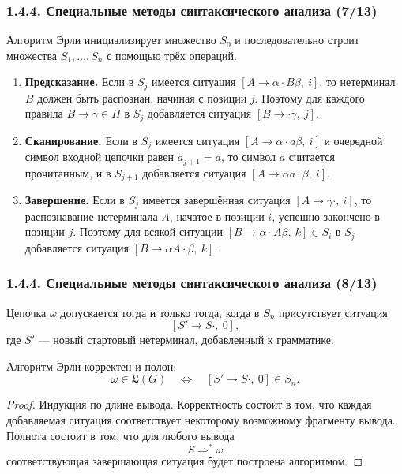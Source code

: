 \begin{frame}
\frametitle{1.4.4. Специальные методы синтаксического анализа (7/13)}

Алгоритм Эрли инициализирует множество $S_0$ и последовательно строит множества
$S_1,\dots,S_n$ с помощью трёх операций.

\begin{enumerate}
    \item \textbf{Предсказание.}
    Если в $S_j$ имеется ситуация
    $[A \to \alpha \cdot B\beta,\ i]$,
    то нетерминал $B$ должен быть распознан, начиная с позиции $j$.
    Поэтому для каждого правила $B \to \gamma \in \Pi$
    в $S_j$ добавляется ситуация
    $[B \to \cdot \gamma,\ j]$.

    \item \textbf{Сканирование.}
    Если в $S_j$ имеется ситуация
    $[A \to \alpha \cdot a\beta,\ i]$
    и очередной символ входной цепочки равен $a_{j+1}=a$,
    то символ $a$ считается прочитанным, и в $S_{j+1}$ добавляется
    ситуация
    $[A \to \alpha a \cdot \beta,\ i]$.

    \item \textbf{Завершение.}
    Если в $S_j$ имеется завершённая ситуация
    $[A \to \gamma \cdot,\ i]$,
    то распознавание нетерминала $A$, начатое в позиции $i$,
    успешно закончено в позиции $j$.
    Поэтому для всякой ситуации
    $[B \to \alpha \cdot A\beta,\ k]\in S_i$
    в $S_j$ добавляется ситуация
    $[B \to \alpha A \cdot \beta,\ k]$.
\end{enumerate}

\end{frame}

\begin{frame}
\frametitle{1.4.4. Специальные методы синтаксического анализа (8/13)}

Цепочка $\omega$ допускается тогда и только тогда, когда в $S_n$ присутствует
ситуация
\[
[S' \to S \cdot,\ 0],
\]
где $S'$ --- новый стартовый нетерминал, добавленный к грамматике.

\begin{theorem}
Алгоритм Эрли корректен и полон:
\[
\omega \in \mathfrak{L}(G)
\quad \Longleftrightarrow \quad
[S' \to S \cdot,\ 0] \in S_n.
\]
\end{theorem}

\begin{proof}
Индукция по длине вывода. Корректность состоит в том, что каждая добавляемая
ситуация соответствует некоторому возможному фрагменту вывода. Полнота состоит
в том, что для любого вывода
\[
S \Rightarrow^* \omega
\]
соответствующая завершающая ситуация будет построена алгоритмом.
\end{proof}
\end{frame}

